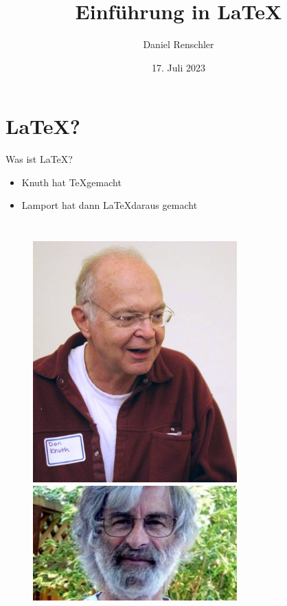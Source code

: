 \documentclass{beamer}
\title{Einf\"uhrung in \LaTeX}
\author{Daniel Renschler}
\date{17. Juli 2023}
\begin{document}
\begin{frame}
    \titlepage 
\end{frame}




\begin{frame}
    \tableofcontents
\end{frame}



\section{\LaTeX?}
\begin{frame}{Was ist \LaTeX?}
    \begin{itemize}
        \item Knuth hat \TeX gemacht
        \item Lamport hat dann \LaTeX daraus gemacht
    \end{itemize}

    \begin{columns}
        
        \hfill
        \begin{figure}[htpb]
            \centering
            \includegraphics[width=0.7\textwidth]{./figs/tex-knuth.jpg}
            \includegraphics[width=0.7\textwidth]{./figs/latex-lamport.jpg}
        \end{figure}
    \end{columns}

\end{frame}
\end{document}
